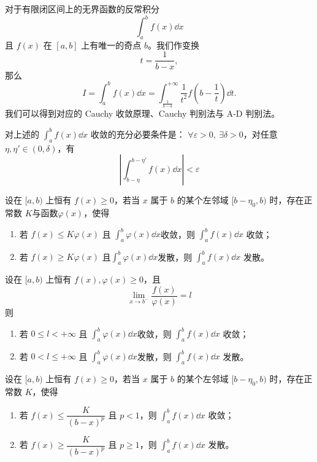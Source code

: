 对于有限闭区间上的无界函数的反常积分
\[
\int_a^b f(x)\dd x
\]
且 \(f(x)\) 在 \([a,b]\) 上有唯一的奇点 \(b\)。我们作变换
\[
t=\frac{1}{b-x},
\]
那么
\[
I=\int_a^b f(x)\dd x=\int_{\tfrac{1}{b-a}}^{+\infty} \frac{1}{t^2} f\left(b-\frac{1}{t}\right) \dd t.
\]
我们可以得到对应的 Cauchy 收敛原理、Cauchy 判别法与 A-D 判别法。
\begin{proposition}
	对上述的 $\displaystyle \int_a^b f(x)\dd x$ 收敛的充分必要条件是：
	$\forall \varepsilon>0,\ \exists \delta>0$，对任意 $\eta,\eta' \in (0,\delta)$，有
	\[
	\left| \int_{b-\eta}^{b-\eta'} f(x)\dd x \right| < \varepsilon
	\]
\end{proposition}
\begin{proposition}
	设在 $[a,b)$ 上恒有 $f(x) \ge 0$，若当 $x$ 属于 $b$ 的某个左邻域 $[b-\eta_0,b)$ 时，存在正常数 $K$与函数$\varphi(x)$，使得
	\begin{enumerate}
		\item 若 $f(x) \le K\varphi(x)$ 且 $\displaystyle\int_a^b \varphi(x)\dd x$收敛，则 $\displaystyle \int_a^b f(x)\dd x$ 收敛；
		\item 若 $f(x) \ge  K\varphi(x)$ 且$\displaystyle\int_a^b \varphi(x)\dd x$发散，则 $\displaystyle \int_a^b f(x)\dd x$ 发散。
	\end{enumerate}
\end{proposition}
\begin{proposition}
	设在 $[a,b)$ 上恒有 $f(x),\varphi(x) \ge 0$，且
	\[
	\lim_{x \to b^-} \dfrac{f(x)}{\varphi(x)} = l
	\]
	则
	\begin{enumerate}
		\item 若 $0 \le l < +\infty$ 且 $\displaystyle\int_a^b \varphi(x)\dd x$收敛，则 $\displaystyle \int_a^b f(x)\dd x$ 收敛；
		\item 若 $0 < l \le +\infty$ 且 $\displaystyle\int_a^b \varphi(x)\dd x$发散，则 $\displaystyle \int_a^b f(x)\dd x$ 发散。
	\end{enumerate}
	
\end{proposition}
\begin{proposition}
	设在 $[a,b)$ 上恒有 $f(x) \ge 0$，若当 $x$ 属于 $b$ 的某个左邻域 $[b-\eta_0,b)$ 时，存在正常数 $K$，使得\begin{enumerate}
		\item 若 $f(x) \le \dfrac{K}{(b-x)^p}$ 且 $p<1$，则 $\displaystyle \int_a^b f(x)\dd x$ 收敛；
		\item 若 $f(x) \ge \dfrac{K}{(b-x)^p}$ 且 $p \ge 1$，则 $\displaystyle \int_a^b f(x)\dd x$ 发散。
	\end{enumerate}
\end{proposition}
